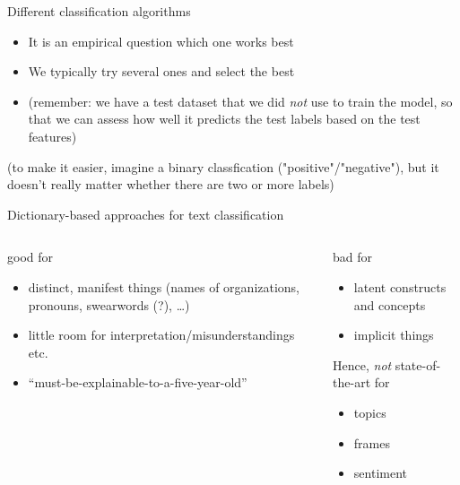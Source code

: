 \begin{frame}[plain]
\begin{columns}[]
		
	\end{columns}
	
\end{frame}





\begin{frame}{Different classification algorithms}
	
	\begin{itemize}[<+->]
		\item It is an empirical question which one works best
		\item We typically try several ones and select the best
		\item (remember: we have a test dataset that we did \emph{not} use to train the model, so that we can assess how well it predicts the test labels based on the test features)
	\end{itemize}
	(to make it easier, imagine a binary classfication ("positive"/"negative"), but it doesn't really matter whether there are two or more labels)
\end{frame}




\begin{frame}{Dictionary-based approaches for text classification}
	\begin{columns}[t]
		\begin{block}{good for}
			\begin{itemize}
				\item distinct, manifest things (names of organizations, pronouns, swearwords (?), \ldots)
				\item little room for interpretation/misunderstandings etc.
				\item ``must-be-explainable-to-a-five-year-old''
			\end{itemize}
			\pause
		\end{block}
		\begin{alertblock}{bad for}
			\begin{itemize}
				\item latent constructs and concepts
				\item implicit things
			\end{itemize}
			\pause
			Hence, \emph{not} state-of-the-art for
			\begin{itemize}
				\item topics
				\item frames
				\item sentiment
			\end{itemize}
		\end{alertblock}
	\end{columns}
\end{frame}



